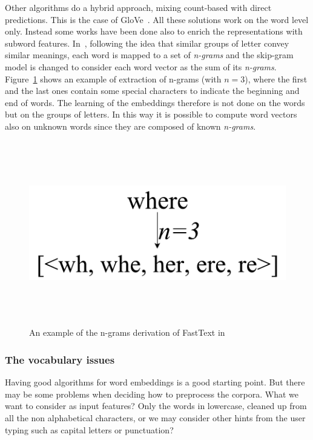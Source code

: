 Other algorithms do a hybrid approach, mixing count-based with direct predictions. This is the case of GloVe~\cite{pennington2014glove}. All these solutions work on the word level only. Instead some works have been done also to enrich the representations with subword features. In~\cite{bojanowski2016enriching}, following the idea that similar groups of letter convey similar meanings, each word is mapped to a set of \textit{n-grams} and the skip-gram model is changed to consider each word vector as the sum of its \textit{n-grams}. Figure~\ref{fig:fastText} shows an example of extraction of n-grams (with $n=3$), where the first and the last ones contain some special characters to indicate the beginning and end of words. The learning of the embeddings therefore is not done on the words but on the groups of letters. In this way it is possible to compute word vectors also on unknown words since they are composed of known \textit{n-grams}.

\begin{figure}[!htb]
    \centering
    \includegraphics[max width=0.5\linewidth,max height=8cm,keepaspectratio]{figures/fastText}
    \caption{An example of the n-grams derivation of FastText in~\cite{bojanowski2016enriching}}\label{fig:fastText}
\end{figure}

\subsubsection{The vocabulary issues}
\label{soaVocabulary}

Having good algorithms for word embeddings is a good starting point. But there may be some problems when deciding how to preprocess the corpora. What we want to consider as input features? Only the words in lowercase, cleaned up from all the non alphabetical characters, or we may consider other hints from the user typing such as capital letters or punctuation?

